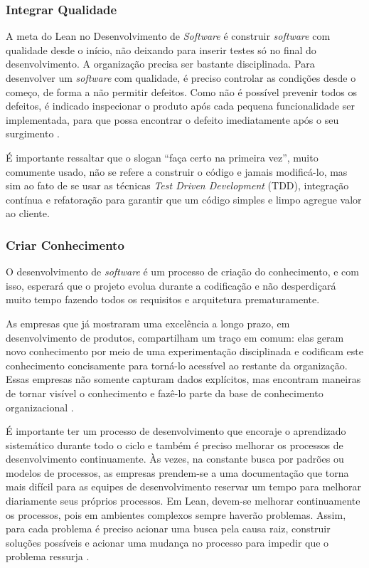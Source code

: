 \subsubsection[Integrar Qualidade]{Integrar Qualidade}

A meta do Lean no Desenvolvimento de \textit{Software} é construir \textit{software} com qualidade desde o início, não deixando para inserir testes só no final do desenvolvimento. A organização precisa ser bastante disciplinada. Para desenvolver um \textit{software} com qualidade, é preciso controlar as condições desde o começo, de forma a não permitir defeitos. Como não é possível prevenir todos os defeitos, é indicado inspecionar o produto após cada pequena funcionalidade ser implementada, para que possa encontrar o defeito imediatamente após o seu surgimento \cite{poppendieck}.

É importante ressaltar que o slogan “faça certo na primeira vez”, muito comumente usado, não se refere a construir o código e jamais modificá-lo, mas sim ao fato de se usar as técnicas \textit{Test Driven Development} (TDD), integração contínua e refatoração para garantir que um código simples e limpo agregue valor ao cliente. 

\subsubsection[Criar Conhecimento]{Criar Conhecimento}

O desenvolvimento de \textit{software} é um processo de criação do conhecimento, e com isso, esperará que o projeto evolua durante a codificação e não desperdiçará muito tempo fazendo todos os requisitos e arquitetura prematuramente. 

As empresas que já mostraram uma excelência a longo prazo, em desenvolvimento de produtos, compartilham um traço em comum: elas geram novo conhecimento por meio de uma experimentação disciplinada e codificam este conhecimento concisamente para torná-lo acessível ao restante da organização. Essas empresas não somente capturam dados explícitos, mas encontram maneiras de tornar visível o conhecimento e fazê-lo parte da base de conhecimento organizacional \cite{nonaka}.

É importante ter um processo de desenvolvimento que encoraje o aprendizado sistemático durante todo o ciclo e também é preciso melhorar os processos de desenvolvimento continuamente. Às vezes, na constante busca por padrões ou modelos de processos, as empresas prendem-se a uma documentação que torna mais difícil para as equipes de desenvolvimento reservar um tempo para melhorar diariamente seus próprios processos. Em Lean, devem-se melhorar continuamente os processos, pois em ambientes complexos sempre haverão problemas. Assim, para cada problema é preciso acionar uma busca pela causa raiz, construir soluções possíveis e acionar uma mudança no processo para impedir que o problema ressurja \cite{poppendieck}. 


